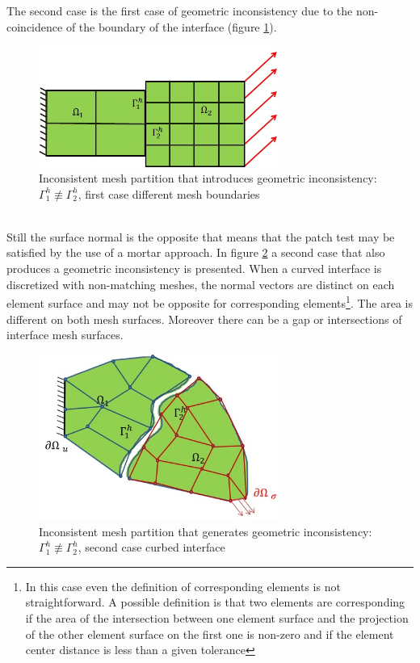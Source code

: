  The second case is the first case of geometric inconsistency due to the non-coincidence of the boundary of the interface (figure \ref{fig.5}).
 \begin{figure}[ht]
 \centering
 \includegraphics[width=8cm]{images/Ch1/Mesh_inconsist_2}
 \caption{Inconsistent mesh partition that introduces geometric inconsistency: $\Gamma_1^{h} \not\equiv  \Gamma_2^{h} $, first case different mesh boundaries} 
 \label{fig.5}
 \end{figure}
  \\
 Still the surface normal is the opposite that means that the patch test may be satisfied by the use of a mortar approach. In figure \ref{fig.6} a second case that also produces a geometric inconsistency is presented. When a curved interface is discretized with non-matching meshes, the normal vectors are distinct on each element surface and may not be opposite for corresponding elements\footnote{In this case even the definition of corresponding elements is not straightforward. A possible definition  is that two elements are corresponding if the area of the intersection between one element surface and the projection of the other element surface on the first one is non-zero and if the element center distance is less than a given tolerance }. The area is different on both mesh surfaces. Moreover there can be a gap or intersections of interface mesh surfaces. 
 \begin{figure}[ht]
 \centering
 \includegraphics[width=8cm]{images/Ch1/Mesh_inconsist_3}
 \caption{Inconsistent mesh partition that generates geometric inconsistency: $\Gamma_1^{h} \not\equiv  \Gamma_2^{h} $, second case curbed interface} 
 \label{fig.6}
 \end{figure}
